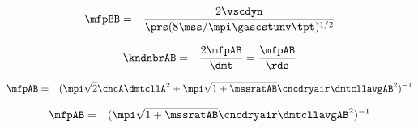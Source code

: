 \documentclass[12pt,twoside]{book}
\begin{document}
\begin{eqnarray}
\mfpBB & = & \frac{2 \vscdyn}{\prs ( 8 \mss / \mpi \gascstunv \tpt )^{1/2} }
\label{eqn:mfp_BB_dfn_2}
\end{eqnarray}

\begin{eqnarray}
\kndnbrAB & = & \frac{2 \mfpAB}{\dmt } = \frac{\mfpAB}{\rds }
\label{eqn:knd_nbr_AB_dfn}
\end{eqnarray}

\begin{eqnarray}
\mfpAB & = & ( \mpi \sqrt{2} \cncA
\dmtcllA^{2} + \mpi \sqrt{ 1 + \mssratAB } 
\cncdryair \dmtcllavgAB^{2} )^{-1}
\label{eqn:mfp_AB_dfn}
\end{eqnarray}

\begin{eqnarray}
\mfpAB & = & ( \mpi \sqrt{ 1 + \mssratAB } 
\cncdryair \dmtcllavgAB^{2} )^{-1}
\label{eqn:mfp_AB_dfn_2}
\end{eqnarray}
\end{document}
